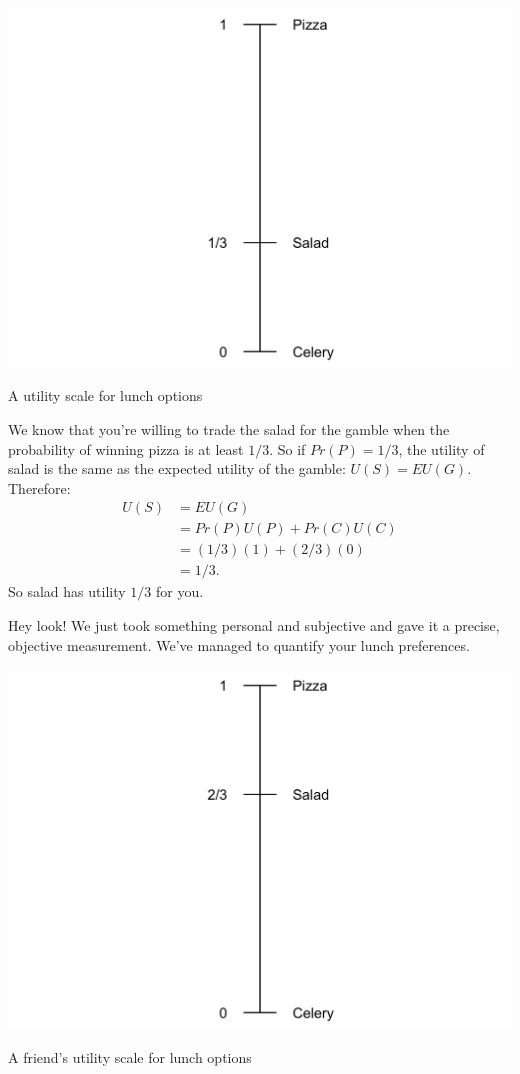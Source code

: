 \documentclass[justified]{tufte-book}
\renewcommand{\u}{U}
\newcommand{\p}{Pr}
\newcommand{\EU}{EU}
\theoremstyle{definition}
\theoremstyle{definition}
\theoremstyle{definition}
\theoremstyle{remark}
\begin{document}
\begin{marginfigure}
\includegraphics{_main_files/figure-latex/unnamed-chunk-105-1} \caption[A utility scale for lunch options]{A utility scale for lunch options}\label{fig:unnamed-chunk-105}
\end{marginfigure}

We know that you're willing to trade the salad for the gamble when the
probability of winning pizza is at least \(1/3\). So if \(\p(P) = 1/3\),
the utility of salad is the same as the expected utility of the gamble:
\(\u(S) = \EU(G)\). Therefore: \[
  \begin{aligned}
    \u(S) &= \EU(G)\\
      &= \p(P)\u(P) + \p(C)\u(C)\\
      &= (1/3)(1) + (2/3)(0)\\
      &= 1/3.
  \end{aligned}
\] So salad has utility \(1/3\) for you.

Hey look! We just took something personal and subjective and gave it a
precise, objective measurement. We've managed to quantify your lunch
preferences.

\begin{marginfigure}
\includegraphics{_main_files/figure-latex/unnamed-chunk-106-1} \caption[A friend's utility scale for lunch options]{A friend's utility scale for lunch options}\label{fig:unnamed-chunk-106}
\end{marginfigure}
\end{document}
